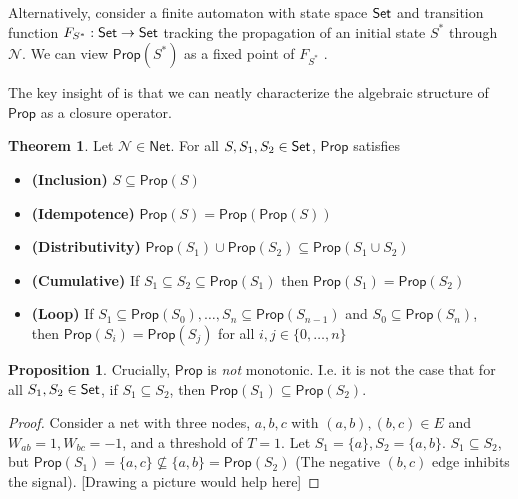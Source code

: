 \documentclass[12pt]{article}
\newcommand{\Set}{\mbox{\sf Set}}
\theoremstyle{definition}
\newtheorem{theorem}{Theorem}
\newtheorem{proposition}{Proposition}
\newcommand{\set}[1]{\{ #1 \}}
\newcommand{\Prop}{\textsf{Prop}}
\newcommand{\AllNets}{\mathsf{Net}}
\newcommand{\Net}{\mathcal{N}}
\begin{document}
Alternatively, consider a finite automaton with state space $\Set$ and transition function $F_{S^\ast} : \Set \to \Set$ tracking the propagation of an initial state $S^\ast$ through $\Net$.  We can view $\Prop(S^\ast)$ as a fixed point of $F_{S^\ast}$ \cite{leitgeb2001nonmonotonic}.

The key insight of \cite{leitgeb2001nonmonotonic} is that we can neatly characterize the algebraic structure of $\Prop$ as a closure operator.

\begin{theorem}
Let $\Net \in \AllNets$.  For all $S, S_1, S_2 \in \Set$, $\Prop$ satisfies
\begin{itemize}
    \item \textbf{(Inclusion)} $S \subseteq \Prop(S)$
    
    \item \textbf{(Idempotence)} $\Prop(S) = \Prop(\Prop(S))$
    
    \item \textbf{(Distributivity)} 
    $\Prop(S_1) \cup \Prop(S_2) \subseteq \Prop(S_1 \cup S_2)$
    
    
    \item \textbf{(Cumulative)} If ${S_1 \subseteq S_2 \subseteq \Prop(S_1)}$ then ${\Prop(S_1) = \Prop(S_2)}$
    
    \item \textbf{(Loop)} If ${S_1 \subseteq \Prop(S_0)}, \ldots, {S_n \subseteq \Prop(S_{n-1})}$ and ${S_0 \subseteq \Prop(S_n)}$,\\ then ${\Prop(S_i) = \Prop(S_j)}$ for all $i, j \in \set{0, \ldots, n}$
\end{itemize}
\end{theorem}

\begin{proposition}
Crucially, $\Prop$ is \emph{not} monotonic.  I.e. it is not the case that for all $S_1, S_2 \in \Set$, if $S_1 \subseteq S_2$, then $\Prop(S_1) \subseteq \Prop(S_2)$.
\end{proposition}
\begin{proof}
Consider a net with three nodes, $a, b, c$ with $(a, b), (b, c) \in E$ and $W_{ab} = 1, W_{bc} = -1$, and a threshold of $T = 1$.  Let $S_1 = \set{a}, S_2 = \set{a, b}$.  $S_1 \subseteq S_2$, but $\Prop(S_1) = \set{a, c} \not \subseteq \set{a, b} = \Prop(S_2)$ (The negative $(b,c)$ edge inhibits the signal). [Drawing a picture would help here]
\end{proof}
\end{document}
